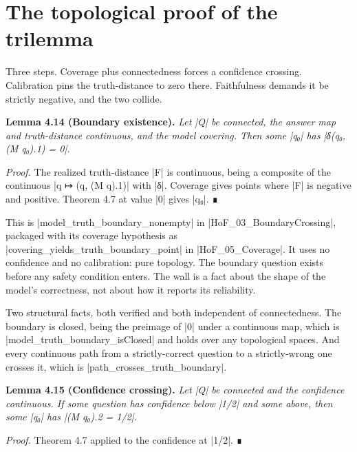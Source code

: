 \documentclass{memoir}
\begin{document}
\section{The topological proof of the trilemma}\label{Two--Schemas--of--Impossibility-005F-005F-005F--Machine--Checked--Limits--of--Trustworthy--Machine--Learning-005F-005F-005F--and--Why--They--Tighten--with--Capability----From--Logic--to--Analysis----The--topological--proof--of--the--trilemma}

Three steps. Coverage plus connectedness forces a confidence crossing.
Calibration pins the truth-distance to zero there. Faithfulness demands it be
strictly negative, and the two collide.

\textbf{Lemma 4.14 (Boundary existence).} \emph{Let \LeanVerb|Q| be connected, the answer map and
truth-distance continuous, and the model covering. Then some \LeanVerb|q₀| has \LeanVerb|δ(q₀, (M q₀).1) = 0|.}

\emph{Proof.} The realized truth-distance \LeanVerb|F| is continuous, being a composite of the
continuous \LeanVerb|q ↦ (q, (M q).1)| with \LeanVerb|δ|. Coverage gives points where \LeanVerb|F| is
negative and positive. Theorem 4.7 at value \LeanVerb|0| gives \LeanVerb|q₀|. ∎

This is \LeanVerb|model_truth_boundary_nonempty| in \LeanVerb|HoF_03_BoundaryCrossing|, packaged
with its coverage hypothesis as \LeanVerb|covering_yields_truth_boundary_point| in
\LeanVerb|HoF_05_Coverage|. It uses no confidence and no calibration: pure topology. The
boundary question exists before any safety condition enters. The wall is a fact
about the shape of the model's correctness, not about how it reports its
reliability.

Two structural facts, both verified and both independent of connectedness. The
boundary is closed, being the preimage of \LeanVerb|0| under a continuous map, which is
\LeanVerb|model_truth_boundary_isClosed| and holds over any topological spaces. And every
continuous path from a strictly-correct question to a strictly-wrong one crosses
it, which is \LeanVerb|path_crosses_truth_boundary|.

\textbf{Lemma 4.15 (Confidence crossing).} \emph{Let \LeanVerb|Q| be connected and the confidence
continuous. If some question has confidence below \LeanVerb|1/2| and some above, then
some \LeanVerb|q₀| has \LeanVerb|(M q₀).2 = 1/2|.}

\emph{Proof.} Theorem 4.7 applied to the confidence at \LeanVerb|1/2|. ∎
\end{document}
